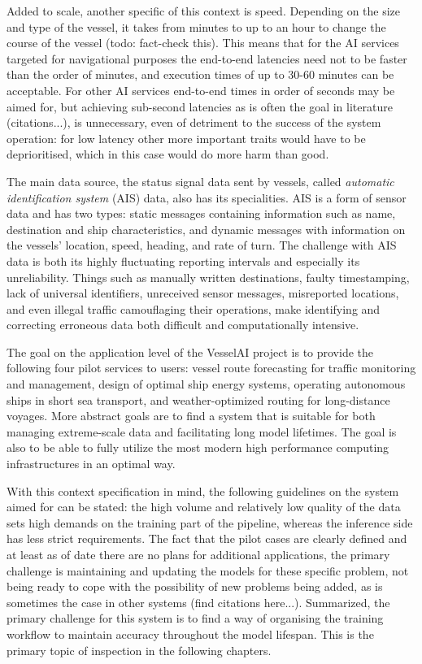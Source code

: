 Added to scale, another specific of this context is speed. Depending on the size and type of the vessel, it takes from minutes to up to an hour to change the course of the vessel (todo: fact-check this). This means that for the AI services targeted for navigational purposes the end-to-end latencies need not to be faster than the order of minutes, and execution times of up to 30-60 minutes can be acceptable. For other AI services end-to-end times in order of seconds may be aimed for, but achieving sub-second latencies as is often the goal in literature (citations...), is unnecessary, even of detriment to the success of the system operation: for low latency other more important traits would have to be deprioritised, which in this case would do more harm than good.

The main data source, the status signal data sent by vessels, called \textit{automatic identification system} (AIS) data, also has its specialities. AIS is a form of sensor data and has two types: static messages containing information such as name, destination and ship characteristics, and dynamic messages with information on the vessels' location, speed, heading, and rate of turn. The challenge with AIS data is both its highly fluctuating reporting intervals and especially its unreliability.  Things such as manually written destinations, faulty timestamping, lack of universal identifiers, unreceived sensor messages, misreported locations, and even illegal traffic camouflaging their operations, make identifying and correcting erroneous data both difficult and computationally intensive.

The goal on the application level of the VesselAI project is to provide the following four pilot services to users: vessel route forecasting for traffic monitoring and management, design of optimal ship energy systems, operating autonomous ships in short sea transport, and weather-optimized routing for long-distance voyages. More abstract goals are to find a system that is suitable for both managing extreme-scale data and facilitating long model lifetimes. The goal is also to be able to fully utilize the most modern high performance computing infrastructures in an optimal way.

With this context specification in mind, the following guidelines on the system aimed for can be stated: the high volume and relatively low quality of the data sets high demands on the training part of the pipeline, whereas the inference side has less strict requirements. The fact that the pilot cases are clearly defined and at least as of date there are no plans for additional applications, the primary challenge is maintaining and updating the models for these specific problem, not being ready to cope with the possibility of new problems being added, as is sometimes the case in other systems (find citations here...).  Summarized, the primary challenge for this system is to find a way of organising the training workflow to maintain accuracy throughout the model lifespan. This is the primary topic of inspection in the following chapters.

